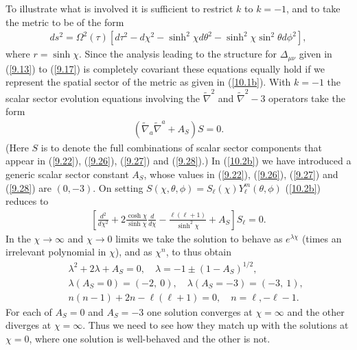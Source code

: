 To illustrate what is involved it is sufficient to restrict $k$ to $k=-1$, and to take the metric to be of the form 
%
\begin{eqnarray}
ds^2=\Omega^2(\tau)\left[ d\tau^2-d\chi^2-\sinh^2\chi d\theta^2-\sinh^2\chi\sin^2\theta d\phi^2\right],
\label{10.1b}
\end{eqnarray}
%
where $r=\sinh \chi$. Since the analysis leading to the structure for $\Delta_{\mu\nu}$ given in (\ref{9.13}) to (\ref{9.17}) is completely covariant these equations equally hold if we represent the spatial sector of the metric as given in (\ref{10.1b}). With $k=-1$ the scalar sector evolution equations involving the $\tilde{\nabla}^2$ and $\tilde{\nabla}^2-3$ operators take the form
%
\begin{eqnarray}
(\tilde{\nabla}_a\tilde{\nabla}^a+A_S)S=0.
\label{10.2b}
\end{eqnarray}
%
(Here $S$ is to denote the full combinations of scalar sector  components that appear in  (\ref{9.22}), (\ref{9.26}), (\ref{9.27}) and (\ref{9.28}).)  In (\ref{10.2b}) we have introduced a generic scalar sector constant $A_S$, whose values in  (\ref{9.22}), (\ref{9.26}), (\ref{9.27}) and (\ref{9.28})  are $(0,-3)$. On setting $S(\chi,\theta,\phi)=S_{\ell}(\chi)Y^m_{\ell}(\theta,\phi)$ (\ref{10.2b}) reduces to 
%  
\begin{eqnarray}
\left[\frac{d^2}{d\chi^2}+2\frac{\cosh\chi }{\sinh\chi}\frac{d }{ d\chi}
-\frac{\ell(\ell+1)}{ \sinh^2\chi}+A_S\right]S_{\ell}=0.
\label{10.3b}
\end{eqnarray}
%
In the  $\chi\rightarrow \infty$ and $\chi\rightarrow 0$ limits  we take the solution to behave as $e^{\lambda \chi}$ (times an irrelevant polynomial in $\chi$), and as $\chi^n$, to thus obtain
%
\begin{eqnarray}
&&\lambda^2+2\lambda+A_S=0,\quad \lambda=-1\pm(1-A_S)^{1/2},
\nonumber\\
&&\lambda(A_S=0)=(-2,~0),\quad \lambda(A_S=-3)=(-3,~1),
\nonumber\\
&&n(n-1)+2n-\ell(\ell+1)=0,\quad n=\ell,-\ell-1.
\label{10.4b}
\end{eqnarray}
%
For each of $A_S=0$ and  $A_S=-3$ one solution converges at $\chi=\infty$ and the other diverges at $\chi=\infty$. Thus we need to see how they match up with the solutions at $\chi=0$, where one solution is well-behaved and the other is not. 

